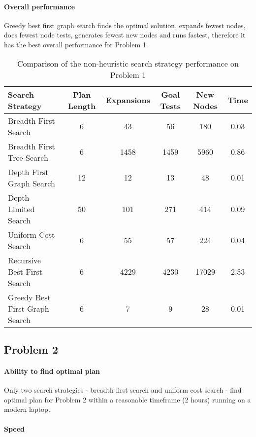 \documentclass[11pt]{article}
\begin{document}
\paragraph{Overall performance}

Greedy best first graph search finds the optimal solution, expands fewest nodes, does fewest node tests, generates fewest new nodes and runs fastest, therefore it has the best overall performance for Problem 1.

\begin{table}[H]
  \centering
  \caption{Comparison of the non-heuristic search strategy performance on Problem 1}
  \bigskip
  \label{table:nhp1}
  \bgroup
  \def\arraystretch{1.5}
  \begin{tabular}{l|c|c|c|c|c}
    Search Strategy & Plan Length & Expansions & Goal Tests & New Nodes & Time \\
    \hline
    Breadth First Search & 6 & 43 & 56 & 180 & 0.03 \\
    Breadth First Tree Search & 6 & 1458 & 1459 & 5960 & 0.86 \\
    Depth First Graph Search & 12 & 12 & 13 & 48 & 0.01 \\
    Depth Limited Search & 50 & 101 & 271 & 414 & 0.09 \\
    Uniform Cost Search & 6 & 55 & 57 & 224 & 0.04 \\
    Recursive Best First Search & 6 & 4229 & 4230 & 17029 & 2.53 \\
    Greedy Best First Graph Search & 6 & 7 & 9 & 28 & 0.01
  \end{tabular}
  \egroup
\end{table}


\subsection{Problem 2}

\paragraph{Ability to find optimal plan}

Only two search strategies - breadth first search and uniform cost search - find optimal plan for Problem 2 within a reasonable timeframe (2 hours) running on a modern laptop.

\paragraph{Speed}
\end{document}
